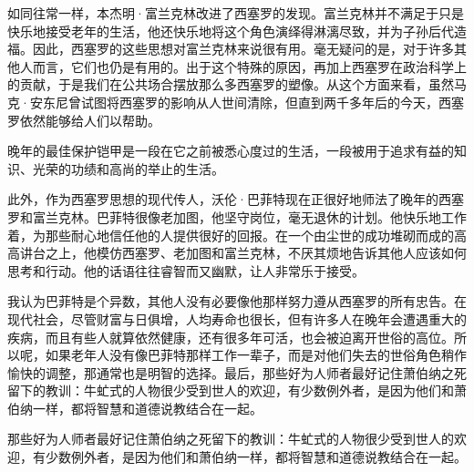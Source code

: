 如同往常一样，本杰明·富兰克林改进了西塞罗的发现。富兰克林并不满足于只是快乐地接受老年的生活，他还快乐地将这个角色演绎得淋漓尽致，并为子孙后代造福。因此，西塞罗的这些思想对富兰克林来说很有用。毫无疑问的是，对于许多其他人而言，它们也仍是有用的。出于这个特殊的原因，再加上西塞罗在政治科学上的贡献，于是我们在公共场合摆放那么多西塞罗的塑像。从这个方面来看，虽然马克·安东尼曾试图将西塞罗的影响从人世间清除，但直到两千多年后的今天，西塞罗依然能够给人们以帮助。
\par

\begin{WisdomBox}
\par

晚年的最佳保护铠甲是一段在它之前被悉心度过的生活，一段被用于追求有益的知识、光荣的功绩和高尚的举止的生活。
\par
\end{WisdomBox}

此外，作为西塞罗思想的现代传人，沃伦·巴菲特现在正很好地师法了晚年的西塞罗和富兰克林。巴菲特很像老加图，他坚守岗位，毫无退休的计划。他快乐地工作着，为那些耐心地信任他的人提供很好的回报。在一个由尘世的成功堆砌而成的高高讲台之上，他模仿西塞罗、老加图和富兰克林，不厌其烦地告诉其他人应该如何思考和行动。他的话语往往睿智而又幽默，让人非常乐于接受。
\par

我认为巴菲特是个异数，其他人没有必要像他那样努力遵从西塞罗的所有忠告。在现代社会，尽管财富与日俱增，人均寿命也很长，但有许多人在晚年会遭遇重大的疾病，而且有些人就算依然健康，还有很多年可活，也会被迫离开世俗的高位。所以呢，如果老年人没有像巴菲特那样工作一辈子，而是对他们失去的世俗角色稍作愉快的调整，那通常也是明智的选择。最后，那些好为人师者最好记住萧伯纳之死留下的教训：牛虻式的人物很少受到世人的欢迎，有少数例外者，是因为他们和萧伯纳一样，都将智慧和道德说教结合在一起。
\par

\begin{WisdomBox}
\par

那些好为人师者最好记住萧伯纳之死留下的教训：牛虻式的人物很少受到世人的欢迎，有少数例外者，是因为他们和萧伯纳一样，都将智慧和道德说教结合在一起。
\par
\end{WisdomBox}

